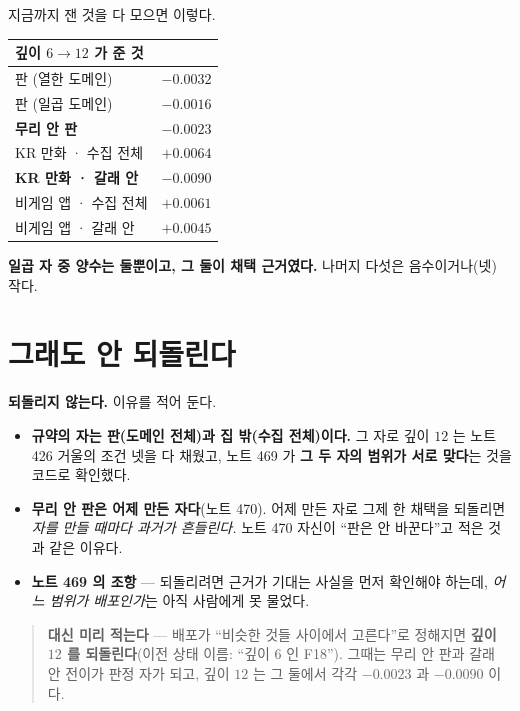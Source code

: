 \documentclass[11pt]{article}
\begin{document}
지금까지 잰 것을 다 모으면 이렇다.

\begin{center}
\begin{tabular}{lr}
\hline
깊이 $6 \to 12$ 가 준 것 & \\
\hline
판 (열한 도메인) & $-0.0032$ \\
판 (일곱 도메인) & $-0.0016$ \\
\textbf{무리 안 판} & $\mathbf{-0.0023}$ \\
KR 만화 · 수집 전체 & $+0.0064$ \\
\textbf{KR 만화 · 갈래 안} & $\mathbf{-0.0090}$ \\
비게임 앱 · 수집 전체 & $+0.0061$ \\
비게임 앱 · 갈래 안 & $+0.0045$ \\
\hline
\end{tabular}
\end{center}

\textbf{일곱 자 중 양수는 둘뿐이고, 그 둘이 채택 근거였다.} 나머지 다섯은
음수이거나(넷) 작다.

\section{그래도 안 되돌린다}

\textbf{되돌리지 않는다.} 이유를 적어 둔다.

\begin{itemize}
\item \textbf{규약의 자는 판(도메인 전체)과 집 밖(수집 전체)이다.} 그
자로 깊이 $12$ 는 노트 426 거울의 조건 넷을 다 채웠고, 노트 469 가
\textbf{그 두 자의 범위가 서로 맞다}는 것을 코드로 확인했다.
\item \textbf{무리 안 판은 어제 만든 자다}(노트 470). 어제 만든 자로
그제 한 채택을 되돌리면 \emph{자를 만들 때마다 과거가 흔들린다.} 노트 470
자신이 ``판은 안 바꾼다''고 적은 것과 같은 이유다.
\item \textbf{노트 469 의 조항} --- 되돌리려면 근거가 기대는 사실을 먼저
확인해야 하는데, \emph{어느 범위가 배포인가}는 아직 사람에게 못 물었다.
\end{itemize}

\begin{quote}
\textbf{대신 미리 적는다} --- 배포가 ``비슷한 것들 사이에서 고른다''로
정해지면 \textbf{깊이 $12$ 를 되돌린다}(이전 상태 이름: ``깊이 $6$ 인
F18''). 그때는 무리 안 판과 갈래 안 전이가 판정 자가 되고, 깊이 $12$ 는
그 둘에서 각각 $-0.0023$ 과 $-0.0090$ 이다.
\end{quote}
\end{document}
